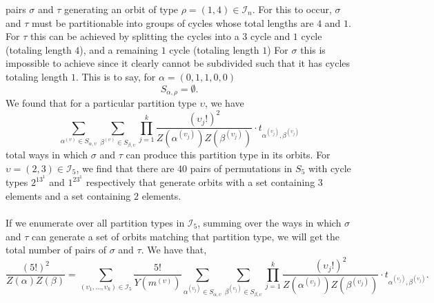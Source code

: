pairs $\sigma$ and $\tau$ generating an orbit of type $\rho =
(1,4)\in\mathcal{I}_n$. For this to occur, $\sigma$ and $\tau$
must be partitionable into groups of cycles whose total lengths are
$4$ and $1$. For $\tau$ this can be achieved by splitting the cycles
into a $3$ cycle and $1$ cycle (totaling length $4$), and a remaining
$1$ cycle (totaling length $1$) For $\sigma$ this is impossible to
achieve since it clearly cannot be subdivided such that it has cycles
totaling length $1$. This is to
say, for $\alpha = (0,1,1,0,0)$
\[
  S_{\alpha,\rho} = \emptyset.
\]
We found that for a particular partition type $\upsilon$, we have
\[
  \sum_{\alpha^{(\upsilon)}\in
  S_{\alpha,\upsilon}}\sum_{\beta^{(\upsilon)}\in
  S_{\beta,\upsilon}}\prod_{j=1}^k
  {\frac{(\upsilon_j!)^2}{Z(\alpha^{(\upsilon_j)})Z(\beta^{(\upsilon_j)})}}\cdot
t_{\alpha^{(\upsilon_j)},\beta^{(\upsilon_j)}}\]
total ways in which $\sigma$ and $\tau$ can produce this partition type in
its orbits.
For $\upsilon = (2,3)\in\mathcal{I}_5$, we find that there are $40$
pairs of permutations in $S_5$ with cycle
types $2^13^1$ and $1^23^1$ respectively that generate orbits with a
set containing $3$ elements and a set containing $2$ elements.
\\\\If we enumerate over all partition types in $\mathcal{I}_5$, summing over
the ways in which $\sigma$ and $\tau$ can generate a set of orbits
matching that partition type, we will get the total number of pairs of
$\sigma$ and $\tau$. We have that,
\[
  \frac{(5!)^2}{Z(\alpha)Z(\beta)} =
  \sum_{(\upsilon_1,\dots,\upsilon_k)\in\mathcal{I}_5}\frac{5!}{Y(m^{(\upsilon)})}\sum_{\alpha^{(\upsilon_j)}\in
  S_{\alpha,\upsilon}}\sum_{\beta^{(\upsilon_j)}\in
  S_{\beta,\upsilon}}\prod_{j=1}^k
  {\frac{(\upsilon_j!)^2}{Z(\alpha^{(\upsilon_j)})Z(\beta^{(\upsilon_j)})}}\cdot
  t_{\alpha^{(\upsilon_j)},\beta^{(\upsilon_j)}}.
\]
